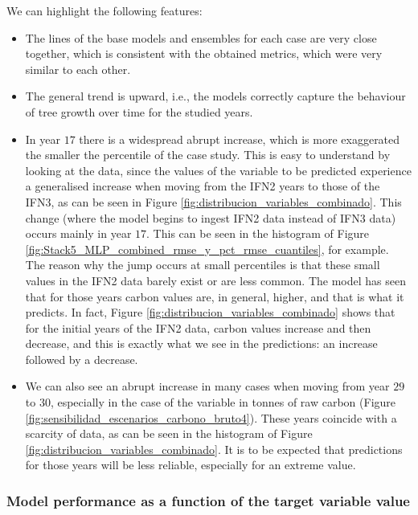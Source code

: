 We can highlight the following features:
\begin{itemize}
      \item The lines of the base models and ensembles for each case are very close together, which is consistent with the obtained metrics, which were very similar to each other.
      \item The general trend is upward, i.e., the models correctly capture the behaviour of tree growth over time for the studied years.
      \item In year $17$ there is a widespread abrupt increase, which is more exaggerated the smaller the percentile of the case study. This is easy to understand by looking at the data, since the values of the variable to be predicted experience a generalised increase when moving from the IFN2 years to those of the IFN3, as can be seen in Figure \ref{fig:distribucion_variables_combinado}. This change (where the model begins to ingest IFN2 data instead of IFN3 data) occurs mainly in year $17$. This can be seen in the histogram of Figure \ref{fig:Stack5_MLP_combined_rmse_y_pct_rmse_cuantiles}, for example. The reason why the jump occurs at small percentiles is that these small values in the IFN2 data barely exist or are less common. The model has seen that for those years carbon values are, in general, higher, and that is what it predicts. In fact, Figure \ref{fig:distribucion_variables_combinado} shows that for the initial years of the IFN2 data, carbon values increase and then decrease, and this is exactly what we see in the predictions: an increase followed by a decrease.
      \item We can also see an abrupt increase in many cases when moving from year $29$ to $30$, especially in the case of the variable in tonnes of raw carbon (Figure \ref{fig:sensibilidad_escenarios_carbono_bruto4}). These years coincide with a scarcity of data, as can be seen in the histogram of Figure \ref{fig:distribucion_variables_combinado}. It is to be expected that predictions for those years will be less reliable, especially for an extreme value.
\end{itemize}


\subsubsection{Model performance as a function of the target variable value}


